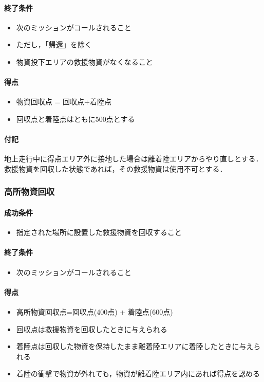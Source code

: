 \paragraph{終了条件}
\begin{itemize}
\item 次のミッションがコールされること
  \item ただし，「帰還」を除く
\item 物資投下エリアの救援物資がなくなること
\end{itemize}
\paragraph{得点}
\begin{itemize}
\item 物資回収点 = 回収点+着陸点
\item 回収点と着陸点はともに500点とする
\end{itemize}
\paragraph{付記}
地上走行中に得点エリア外に接地した場合は離着陸エリアからやり直しとする．救援物資を回収した状態であれば，その救援物資は使用不可とする．

\subsubsection{高所物資回収}
\paragraph{成功条件}
\begin{itemize}
\item 指定された場所に設置した救援物資を回収すること
\end{itemize}
\paragraph{終了条件}
\begin{itemize}
\item 次のミッションがコールされること
\end{itemize}
\paragraph{得点}
\begin{itemize}
\item 高所物資回収点=回収点(400点) + 着陸点(600点)
\item 回収点は救援物資を回収したときに与えられる
\item 着陸点は回収した物資を保持したまま離着陸エリアに着陸したときに与えられる
  \item 着陸の衝撃で物資が外れても，物資が離着陸エリア内にあれば得点を認める
\end{itemize}
